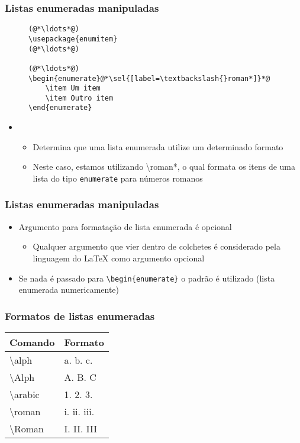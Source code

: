 \begin{frame}[fragile] \frametitle{Listas enumeradas manipuladas}
\begin{figure}[!t]
\begin{lstlisting}
(@*\ldots*@)
\usepackage{enumitem}
(@*\ldots*@)

(@*\ldots*@)
\begin{enumerate}@*\sel{[label=\textbackslash{}roman*]}*@
	\item Um item
	\item Outro item
\end{enumerate}
\end{lstlisting}
\end{figure}

\begin{itemize}
	\item \sel{[label=formato]}
	\begin{itemize}
		\item Determina que uma lista enumerada utilize um determinado formato
		\item Neste caso, estamos utilizando \textbackslash{}roman*, o qual formata os itens de uma lista do tipo \texttt{enumerate} para números romanos
	\end{itemize}
\end{itemize}
\end{frame}

\begin{frame}[fragile] \frametitle{Listas enumeradas manipuladas}
\begin{itemize}
	\item Argumento para formatação de lista enumerada é opcional
	\begin{itemize}
		\item Qualquer argumento que vier dentro de colchetes é considerado pela linguagem do LaTeX como argumento opcional
	\end{itemize}
	\item Se nada é passado para \texttt{\textbackslash{}begin\{enumerate\}} o padrão é utilizado (lista enumerada numericamente)
\end{itemize}
\end{frame}

\begin{frame}[fragile] \frametitle{Formatos de listas enumeradas}
\begin{table}[!h]
\centering
\begin{tabular}{l|l}		
\hline
	\textbf{Comando}       & \textbf{Formato} \\ \hline
	\textbackslash{}alph   & a. b. c.         \\ \hline
	\textbackslash{}Alph   & A. B. C          \\ \hline
	\textbackslash{}arabic & 1. 2. 3.         \\ \hline
	\textbackslash{}roman  & i. ii. iii.      \\ \hline
	\textbackslash{}Roman  & I. II. III       \\ \hline
\end{tabular}
\end{table}
\end{frame}

